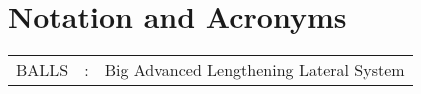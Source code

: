 \chapter*{Notation and Acronyms}
\vspace{1cm}

\noindent
\begin{tabular}{lcl}
BALLS &: & Big Advanced Lengthening Lateral System \\
\end{tabular}
